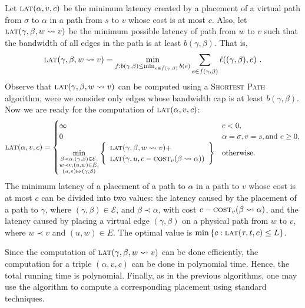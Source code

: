 \documentclass[11pt]{article}
\newcommand{\set}[1]{\left\{ #1 \right\}}
\newcommand{\calE}{\mathcal{E}}
\newcommand{\cost}{\textsc{cost}\xspace}
\newcommand{\latency}{\textsc{lat}\xspace}
\begin{document}
Let $\latency(\alpha,v,c)$ be the minimum latency created by a
placement of a virtual path from $\sigma$ to $\alpha$ in a path from
$s$ to $v$ whose cost is at most $c$.
%
Also, let $\latency(\gamma,\beta,w \leadsto v)$ be the minimum
possible latency of path from $w$ to $v$ such that the bandwidth of
all edges in the path is at least $b(\gamma,\beta)$.  That is,
\[ 
\latency(\gamma,\beta,w \leadsto v)
= \min_{f: b(\gamma,\beta) \leq \min_{e \in \bar{f}(\gamma,\beta)} b(e)}
    \sum_{e \in \bar{f}(\gamma,\beta)} \ell((\gamma,\beta),e)
~.
\]
Observe that $\latency(\gamma,\beta,w \leadsto v)$ can be computed
using a \textsc{Shortest Path} algorithm, were we consider only edges
whose bandwidth cap is at least $b(\gamma,\beta)$.
%
Now we are ready for the computation of $\latency(\alpha,v,c)$:
\[
\latency(\alpha,v,c) =
\begin{cases}
\infty  &  c < 0,\\
0       & \alpha = \sigma, v = s, \text{and } c \geq 0, \\
\displaystyle
\min_{
  \substack{\beta \prec \alpha, (\gamma,\beta) \in \calE, \\
           w \prec v, (u,w) \in E, \\
         (u,v) \Mapsto (\gamma,\beta)}
     }
     \set{\begin{array}{l}
          \latency(\gamma,\beta,w \leadsto v) + \\
          \latency(\gamma,u,c - \cost_v(\beta \leadsto \alpha))
          \end{array}
     }
  & \text{otherwise}.
\end{cases}
\]
The minimum latency of a placement of a path to $\alpha$ in a path to
$v$ whose cost is at most $c$ can be divided into two values: the
latency caused by the placement of a path to $\gamma$, where
$(\gamma,\beta) \in \calE$, and $\beta \prec \alpha$, with cost $c -
\cost_v(\beta \leadsto \alpha)$, and the latency caused by placing a
virtual edge $(\gamma,\beta)$ on a physical path from $w$ to $v$,
where $w \prec v$ and $(u,w) \in E$.
%
The optimal value is $\min \set{c : \latency(\tau,t,c) \leq L}$.

Since the computation of $\latency(\gamma,\beta,w \leadsto v)$ can be
done efficiently, the computation for a triple $(\alpha,v,c)$ can be
done in polynomial time.  Hence, the total running time is polynomial.
Finally, as in the previous algorithms, one may use the algorithm to
compute a corresponding placement
using standard techniques.
\end{document}
